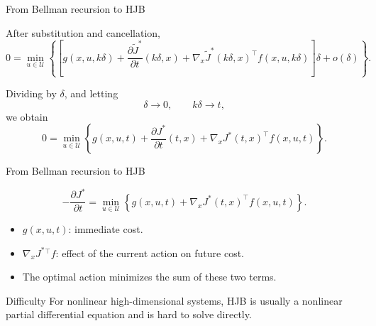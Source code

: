 \documentclass[aspectratio=169]{beamer}
\begin{document}
\begin{frame}{From Bellman recursion to HJB}

After substitution and cancellation,
\[
0
=
\min_{u\in\mathcal U}
\left\{
\left[
g(x,u,k\delta)
+
\frac{\partial \tilde{J}^*}{\partial t}(k\delta,x)
+
\nabla_x\tilde{J}^*(k\delta,x)^\top
f(x,u,k\delta)
\right]\delta
+
o(\delta)
\right\}.
\]

\vspace{0.15cm}

Dividing by \(\delta\), and letting
\[
\delta\to0,
\qquad
k\delta\to t,
\]
we obtain
\[
0
=
\min_{u\in\mathcal U}
\left\{
g(x,u,t)
+
\frac{\partial J^*}{\partial t}(t,x)
+
\nabla_xJ^*(t,x)^\top f(x,u,t)
\right\}.
\]

\end{frame}
\begin{frame}{From Bellman recursion to HJB}

\[
-\frac{\partial J^*}{\partial t}
=
\min_{u\in\mathcal U}
\left\{
g(x,u,t)+\nabla_xJ^*(t,x)^\top f(x,u,t)
\right\}.
\]

\vspace{0.25cm}

\begin{itemize}
    \item $g(x,u,t)$: immediate cost.
    \vspace{0.25cm}

    \item $\nabla_xJ^*{}^\top f$: effect of the current action on future cost.
    \vspace{0.25cm}

    \item The optimal action minimizes the sum of these two terms.
\end{itemize}

\vspace{0.25cm}

\begin{alertblock}{Difficulty}
\small
For nonlinear high-dimensional systems, HJB is usually a nonlinear partial differential equation and is hard to solve directly.
\end{alertblock}

\end{frame}
\end{document}
